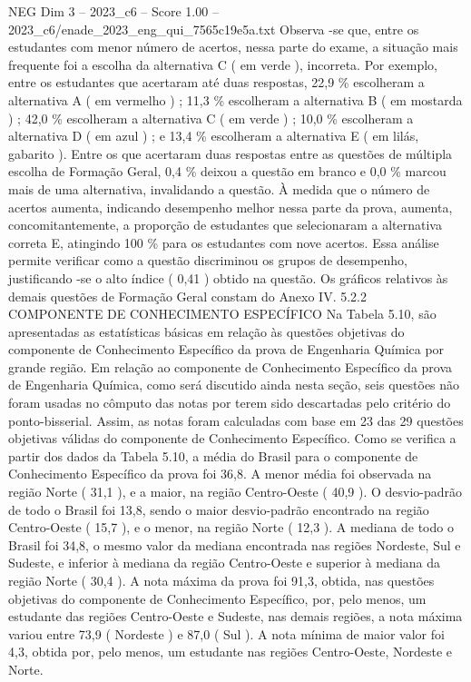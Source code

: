 \begin{textsample}{NEG Dim 3 – 2023\_c6 – Score 1.00 – 2023\_c6/enade\_2023\_eng\_qui\_7565c19e5a.txt}
Observa -se que, entre os estudantes com menor número de acertos, nessa parte do exame, a situação mais frequente foi a escolha da alternativa C ( em verde ), incorreta.
Por exemplo, entre os estudantes que acertaram até duas respostas, 22,9 \% escolheram a alternativa A ( em vermelho ) ; 11,3 \% escolheram a alternativa B ( em mostarda ) ; 42,0 \% escolheram a alternativa C ( em verde ) ; 10,0 \% escolheram a alternativa D ( em azul ) ; e 13,4 \% escolheram a alternativa E ( em lilás, gabarito ).
Entre os que acertaram duas respostas entre as questões de múltipla escolha de Formação Geral, 0,4 \% deixou a questão em branco e 0,0 \% marcou mais de uma alternativa, invalidando a questão.
À medida que o número de acertos aumenta, indicando desempenho melhor nessa parte da prova, aumenta, concomitantemente, a proporção de estudantes que selecionaram a alternativa correta E, atingindo 100 \% para os estudantes com nove acertos.
Essa análise permite verificar como a questão discriminou os grupos de desempenho, justificando -se o alto índice ( 0,41 ) obtido na questão.
Os gráficos relativos às demais questões de Formação Geral constam do Anexo IV. 5.2.2 COMPONENTE DE CONHECIMENTO ESPECÍFICO Na Tabela 5.10, são apresentadas as estatísticas básicas em relação às questões objetivas do componente de Conhecimento Específico da prova de Engenharia Química por grande região.
Em relação ao componente de Conhecimento Específico da prova de Engenharia Química, como será discutido ainda nesta seção, seis questões não foram usadas no cômputo das notas por terem sido descartadas pelo critério do ponto-bisserial.
Assim, as notas foram calculadas com base em 23 das 29 questões objetivas válidas do componente de Conhecimento Específico.
Como se verifica a partir dos dados da Tabela 5.10, a média do Brasil para o componente de Conhecimento Específico da prova foi 36,8.
A menor média foi observada na região Norte ( 31,1 ), e a maior, na região Centro-Oeste ( 40,9 ).
O desvio-padrão de todo o Brasil foi 13,8, sendo o maior desvio-padrão encontrado na região Centro-Oeste ( 15,7 ), e o menor, na região Norte ( 12,3 ).
A mediana de todo o Brasil foi 34,8, o mesmo valor da mediana encontrada nas regiões Nordeste, Sul e Sudeste, e inferior à mediana da região Centro-Oeste e superior à mediana da região Norte ( 30,4 ).
A nota máxima da prova foi 91,3, obtida, nas questões objetivas do componente de Conhecimento Específico, por, pelo menos, um estudante das regiões Centro-Oeste e Sudeste, nas demais regiões, a nota máxima variou entre 73,9 ( Nordeste ) e 87,0 ( Sul ).
A nota mínima de maior valor foi 4,3, obtida por, pelo menos, um estudante nas regiões Centro-Oeste, Nordeste e Norte.

\end{textsample}
